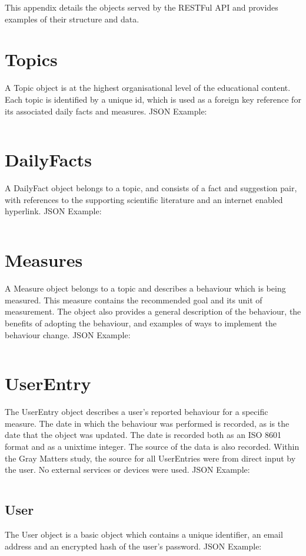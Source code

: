  \label{apndx: rest-objects}
This appendix details the objects served by the RESTFul API and provides examples of their structure and data.

\section{Topics}
A Topic object is at the highest organisational level of the educational content. Each topic is identified by a unique id, which is used as a foreign key reference for its associated daily facts and measures. JSON Example: \inputminted{json}{Files/prevention-study-1/code/topicexample.json}

\section{DailyFacts}
A DailyFact object belongs to a topic, and consists of a fact and suggestion pair, with references to the supporting scientific literature and an internet enabled hyperlink. JSON Example: \inputminted{json}{Files/prevention-study-1/code/dailyfact.json}

\section{Measures}
A Measure object belongs to a topic and describes a behaviour which is being measured. This measure contains the recommended goal and its unit of measurement. The object also provides a general description of the behaviour, the benefits of adopting the behaviour, and examples of ways to implement the behaviour change. JSON Example: \inputminted{json}{Files/prevention-study-1/code/measures.json}

\section{UserEntry}
The UserEntry object describes a user's reported behaviour for a specific measure. The date in which the behaviour was performed is recorded, as is the date that the object was updated. The date is recorded both as an ISO 8601 format and as a unixtime integer. The source of the data is also recorded. Within the Gray Matters study, the source for all UserEntries were from direct input by the user. No external services or devices were used. JSON Example: \inputminted{json}{Files/prevention-study-1/code/userentry.json}

\subsection{User}
The User object is a basic object which contains a unique identifier, an email address and an encrypted hash of the user's password. JSON Example:
\inputminted{json}{Files/prevention-study-1/code/user.json}

